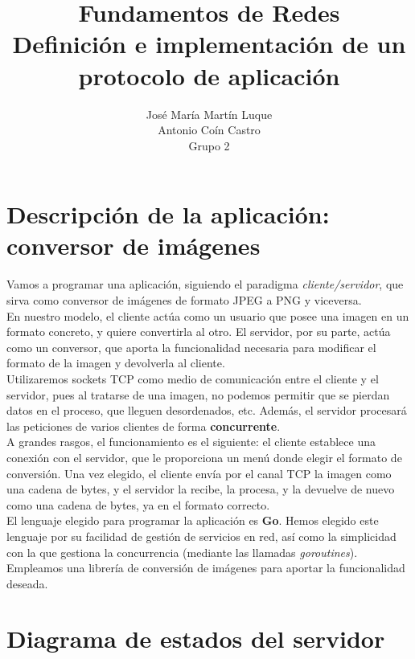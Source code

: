 \documentclass[11pt]{article}
\title{Fundamentos de Redes\\ \Large{Definición e implementación de un protocolo de aplicación}}
\author{José María Martín Luque\\ Antonio Coín Castro\\ \vspace{.5em}Grupo 2}
\begin{document}
\maketitle

\section{Descripción de la aplicación: conversor de imágenes}

Vamos a programar una aplicación, siguiendo el paradigma \textit{cliente/servidor}, que sirva como conversor de imágenes de formato JPEG a PNG y viceversa.\\

En nuestro modelo, el cliente actúa como un usuario que posee una imagen en un formato concreto, y quiere convertirla al otro. El servidor, por su parte, actúa como un conversor, que aporta la funcionalidad necesaria para modificar el formato de la imagen y devolverla al cliente.\\

Utilizaremos sockets TCP como medio de comunicación entre el cliente y el servidor, pues al tratarse de una imagen, no podemos permitir que se pierdan datos en el proceso, que lleguen desordenados, etc. Además, el servidor procesará las peticiones de varios clientes de forma \textbf{concurrente}.\\

A grandes rasgos, el funcionamiento es el siguiente: el cliente establece una conexión con 
el servidor, que le proporciona un menú donde elegir el formato de conversión. Una vez elegido, el cliente envía por el canal TCP la imagen como una cadena de bytes, y el servidor la recibe, la procesa, y la devuelve de nuevo como una cadena de bytes, ya en el formato correcto.\\

El lenguaje elegido para programar la aplicación es \textbf{Go}. Hemos elegido este lenguaje por su facilidad de gestión de servicios en red, así como la simplicidad con la que gestiona la concurrencia (mediante las llamadas \textit{goroutines}). Empleamos una librería de conversión de imágenes para aportar la funcionalidad deseada.
\newpage 
\section{Diagrama de estados del servidor}
\end{document}
